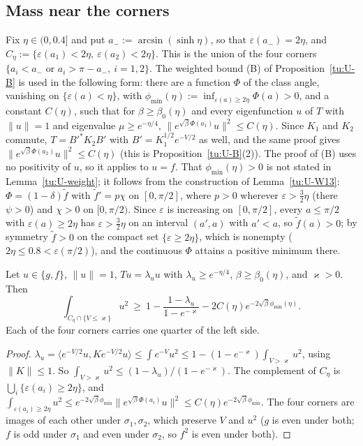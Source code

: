 \subsection{Mass near the corners}

Fix $\eta\in(0,0.4]$ and put $a_-:=\arcsin(\sinh\eta)$, so that $\varepsilon(a_-)=2\eta$, and
$C_\eta:=\{\varepsilon(a_1)<2\eta,\ \varepsilon(a_2)<2\eta\}$. This is the union of the four
corners $\{a_i<a_-\text{ or }a_i>\pi-a_-,\ i=1,2\}$. The weighted bound (B) of
Proposition~\ref{tu:U-B} is used in the following form: there are a function $\Phi$ of the class angle,
vanishing on $\{\varepsilon(a)<\eta\}$, with $\phi_{\min}(\eta):=\inf_{\varepsilon(a)\ge2\eta}\Phi(a)>0$,
and a constant $C(\eta)$, such that for $\beta\ge\beta_0(\eta)$ and every eigenfunction $u$ of $T$
with $\|u\|=1$ and eigenvalue $\mu\ge e^{-\eta/4}$, $\|e^{\sqrt\beta\Phi(a_1)}u\|^2\le C(\eta)$. Since
$K_1$ and $K_2$ commute, $T=B'^*K_2B'$ with $B'=K_1^{1/2}e^{-V/2}$ as well, and the same proof gives
$\|e^{\sqrt\beta\Phi(a_2)}u\|^2\le C(\eta)$ (this is Proposition~\ref{tu:U-B}(2)). The proof of (B) uses no positivity of $u$, so it applies to
$u=f$. That $\phi_{\min}(\eta)>0$ is not stated in Lemma~\ref{tu:U-weight}; it follows from the construction of
Lemma~\ref{tu:U-W13}: $\Phi=(1-\delta)\tilde f$ with $\tilde f'=p\chi$ on $[0,\pi/2]$, where $p>0$ wherever
$\varepsilon>\frac32\eta$ (there $\psi>0$) and $\chi>0$ on $[0,\pi/2)$. Since $\varepsilon$ is increasing on $[0,\pi/2]$, every
$a\le\pi/2$ with $\varepsilon(a)\ge2\eta$ has $\varepsilon>\frac32\eta$ on an interval $(a',a)$ with $a'<a$, so $\tilde f(a)>0$; by symmetry
$\tilde f>0$ on the compact set $\{\varepsilon\ge2\eta\}$, which is nonempty ($2\eta\le0.8<\varepsilon(\pi/2)$), and the continuous
$\Phi$ attains a positive minimum there.

\begin{lemma}[M4]\label{tu:L-M4}
Let $u\in\{g,f\}$, $\|u\|=1$, $Tu=\lambda_uu$ with $\lambda_u\ge e^{-\eta/4}$, $\beta\ge\beta_0(\eta)$,
and $\varkappa>0$. Then
\[
\int_{C_\eta\cap\{V\le\varkappa\}}u^2\ \ge\ 1-\frac{1-\lambda_u}{1-e^{-\varkappa}}-2C(\eta)e^{-2\sqrt\beta\phi_{\min}(\eta)} .
\]
Each of the four corners carries one quarter of the left side.
\end{lemma}

\begin{proof}
$\lambda_u=\langle e^{-V/2}u,Ke^{-V/2}u\rangle\le\int e^{-V}u^2\le1-(1-e^{-\varkappa})\int_{V>\varkappa}u^2$,
using $\|K\|\le1$. So $\int_{V>\varkappa}u^2\le(1-\lambda_u)/(1-e^{-\varkappa})$. The complement of
$C_\eta$ is $\bigcup_i\{\varepsilon(a_i)\ge2\eta\}$, and
$\int_{\varepsilon(a_i)\ge2\eta}u^2\le e^{-2\sqrt\beta\phi_{\min}}\|e^{\sqrt\beta\Phi(a_i)}u\|^2\le C(\eta)e^{-2\sqrt\beta\phi_{\min}}$.
The four corners are images of each other under $\sigma_1,\sigma_2$, which preserve $V$ and $u^2$
($g$ is even under both; $f$ is odd under $\sigma_1$ and even under $\sigma_2$, so $f^2$ is even under both).
\end{proof}

